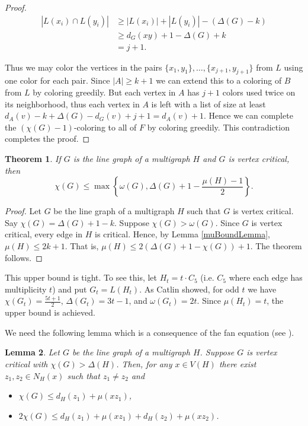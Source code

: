 \documentclass[12pt]{article}
\theoremstyle{plain}
\newtheorem{thm}{Theorem}
\newtheorem{lem}[thm]{Lemma}
\theoremstyle{definition}
\theoremstyle{remark}
\begin{document}
\begin{proof}
\begin{align*}
\left|L(x_i) \cap L(y_i)\right| &\geq |L(x_i)| + |L(y_i)| - (\Delta(G) - k) \\
&\geq d_G(xy) + 1 - \Delta(G) + k \\
&=j + 1.
\end{align*}

Thus we may color the vertices in the pairs $\{x_1, y_1\}, \ldots, \{x_{j+1}, y_{j+1}\}$ from $L$ using one color for each pair.  Since $|A| \geq k + 1$ we can extend this to a coloring of $B$ from $L$ by coloring greedily.  But each vertex in $A$ has $j+1$ colors used twice on its neighborhood, thus each vertex in $A$ is left with a list of size at least $d_A(v) - k + \Delta(G) - d_G(v) + j + 1 = d_A(v) + 1$.  Hence we can complete the $(\chi(G) - 1)$-coloring to all of $F$ by coloring greedily.  This contradiction completes the proof.
\end{proof}

\begin{thm}\label{CriticalMuBound}
If $G$ is the line graph of a multigraph $H$ and $G$ is vertex critical, then
\[\chi(G) \leq \max\left\{\omega(G), \Delta(G) + 1 - \frac{\mu(H) - 1}{2}\right\}.\]
\end{thm}
\begin{proof}
Let $G$ be the line graph of a multigraph $H$ such that $G$ is vertex critical. Say $\chi(G) = \Delta(G) + 1 - k$.  Suppose $\chi(G) > \omega(G)$.  Since $G$ is vertex critical, every edge in $H$ is critical.  Hence, by Lemma \ref{muBoundLemma}, $\mu(H) \leq 2k+1$.  That is, $\mu(H) \leq 2(\Delta(G) + 1 - \chi(G)) + 1$.  The theorem follows.
\end{proof}

This upper bound is tight.  To see this, let $H_t = t \cdot C_5$ (i.e. $C_5$ where each edge has multiplicity $t$) and put $G_t = L(H_t)$.  As Catlin \cite{catlin1979hajos} showed, for odd $t$ we have $\chi(G_t) = \frac{5t + 1}{2}$, $\Delta(G_t) = 3t - 1$, and $\omega(G_t) = 2t$.  Since $\mu(H_t) = t$, the upper bound is achieved.\newline

\noindent We need the following lemma which is a consequence of the fan equation (see \cite{anderson1977edge, cariolaro2006fans, StiebitzVizingGoldberg, GoldbergJGT}).
\begin{lem}\label{FanEquation}
Let $G$ be the line graph of a multigraph $H$.  Suppose $G$ is vertex critical with $\chi(G) > \Delta(H)$. Then, for any $x \in V(H)$ there exist $z_1, z_2 \in N_H(x)$ such that $z_1 \neq z_2$ and 
\begin{itemize}
\item $\chi(G) \leq d_H(z_1) + \mu(xz_1)$,
\item $2\chi(G) \leq d_H(z_1) + \mu(xz_1) + d_H(z_2) + \mu(xz_2)$.
\end{itemize}
\end{lem}
\end{document}
